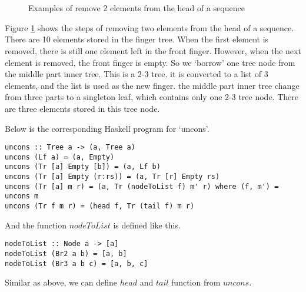 \documentclass[UTF8]{article}
\begin{document}
\begin{figure}[htbp]
  \centering
   \\
   \\
  \caption{Examples of remove 2 elements from the head of a sequence} \label{fig:ftr-uncons-example}
\end{figure}

Figure \ref{fig:ftr-uncons-example} shows the steps of removing two elements from
the head of a sequence. There are 10 elements stored in the finger tree.
When the first element is removed, there is still one element left in the front finger.
However, when the next element is removed, the front finger is empty. So we `borrow'
one tree node from the middle part inner tree. This is a 2-3 tree. it is converted
to a list of 3 elements, and the list is used as the new finger. the middle part
inner tree change from three parts to a singleton leaf, which contains only one
2-3 tree node. There are three elements stored in this tree node.

Below is the corresponding Haskell program for `uncons'.

\lstset{language=Haskell}
\begin{lstlisting}
uncons :: Tree a -> (a, Tree a)
uncons (Lf a) = (a, Empty)
uncons (Tr [a] Empty [b]) = (a, Lf b)
uncons (Tr [a] Empty (r:rs)) = (a, Tr [r] Empty rs)
uncons (Tr [a] m r) = (a, Tr (nodeToList f) m' r) where (f, m') = uncons m
uncons (Tr f m r) = (head f, Tr (tail f) m r)
\end{lstlisting}

And the function $nodeToList$ is defined like this.

\begin{lstlisting}
nodeToList :: Node a -> [a]
nodeToList (Br2 a b) = [a, b]
nodeToList (Br3 a b c) = [a, b, c]
\end{lstlisting}

Similar as above, we can define $head$ and $tail$ function from
$uncons$.
\end{document}
